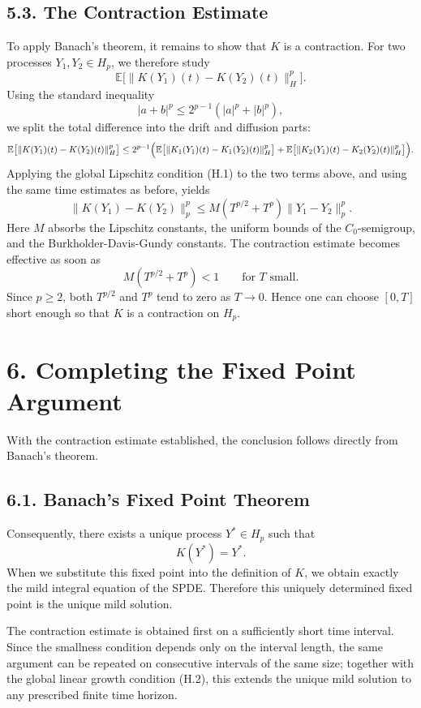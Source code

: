\documentclass[11pt]{article}
\theoremstyle{definition}
\theoremstyle{remark}
\begin{document}
\subsection*{5.3. The Contraction Estimate}
To apply Banach's theorem, it remains to show that \(K\) is a contraction. For two processes \(Y_1,Y_2\in H_p\), we therefore study
\[
\mathbb E\bigl[\|K(Y_1)(t)-K(Y_2)(t)\|_H^p\bigr].
\]
Using the standard inequality
\[
|a+b|^p\le 2^{p-1}(|a|^p+|b|^p),
\]
we split the total difference into the drift and diffusion parts:
\[
\mathbb E\bigl[\|K(Y_1)(t)-K(Y_2)(t)\|_H^p\bigr]
\le
2^{p-1}\Bigl(
\mathbb E\bigl[\|K_1(Y_1)(t)-K_1(Y_2)(t)\|_H^p\bigr]
+
\mathbb E\bigl[\|K_2(Y_1)(t)-K_2(Y_2)(t)\|_H^p\bigr]
\Bigr).
\]
Applying the global Lipschitz condition \textnormal{(H.1)} to the two terms above, and using the same time estimates as before, yields
\[
\|K(Y_1)-K(Y_2)\|_p^p
\le
M(T^{p/2}+T^p)\|Y_1-Y_2\|_p^p.
\]
Here \(M\) absorbs the Lipschitz constants, the uniform bounds of the \(C_0\)-semigroup, and the Burkholder-Davis-Gundy constants. The contraction estimate becomes effective as soon as
\[
M(T^{p/2}+T^p)<1
\qquad \text{for \(T\) small.}
\]
Since \(p\ge 2\), both \(T^{p/2}\) and \(T^p\) tend to zero as \(T\to 0\). Hence one can choose \([0,T]\) short enough so that \(K\) is a contraction on \(H_p\).

\section*{6. Completing the Fixed Point Argument}
With the contraction estimate established, the conclusion follows directly from Banach's theorem.

\subsection*{6.1. Banach's Fixed Point Theorem}
Consequently, there exists a unique process \(Y^*\in H_p\) such that
\[
K(Y^*)=Y^*.
\]
When we substitute this fixed point into the definition of \(K\), we obtain exactly the mild integral equation of the SPDE. Therefore this uniquely determined fixed point is the unique mild solution.

The contraction estimate is obtained first on a sufficiently short time interval. Since the smallness condition depends only on the interval length, the same argument can be repeated on consecutive intervals of the same size; together with the global linear growth condition \textnormal{(H.2)}, this extends the unique mild solution to any prescribed finite time horizon.
\end{document}
